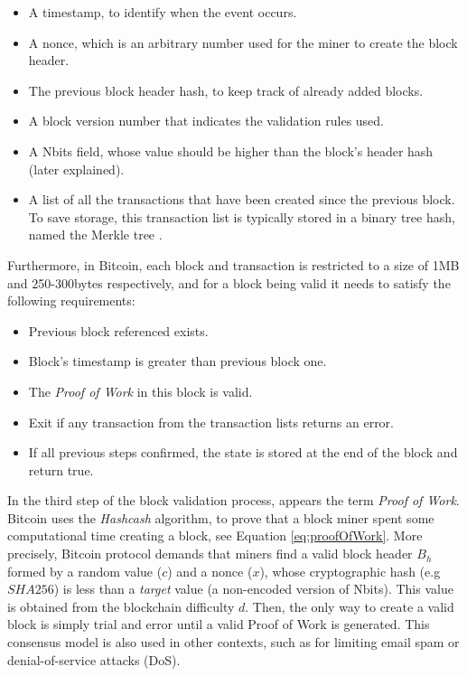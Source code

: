 \begin{itemize}
	\item A timestamp, to identify when the event occurs.
	\item A nonce, which is an arbitrary number used for the miner to create the block header.
	\item The previous block header hash, to keep track of already added blocks.
	\item A block version number that indicates the validation rules used.
	\item A Nbits field, whose value should be higher than the block's header hash (later explained).
	\item A list of all the transactions that have been created since the previous block. To save storage, this transaction list is typically stored in a binary tree hash, named the Merkle tree \citep{merkle1987digital}.

\end{itemize}

Furthermore, in Bitcoin, each block and transaction is restricted to a size of 1MB and 250-300bytes respectively, and for a block being valid it needs to satisfy the following requirements:

\begin{itemize}
	\item Previous block referenced exists.
	\item Block's timestamp is greater than previous block one.
	\item The \textit{Proof of Work} in this block is valid.
	\item Exit if any transaction from the transaction lists returns an error.
	\item If all previous steps confirmed, the state is stored at the end of the block and return true.
\end{itemize}  

In the third step of the block validation process, appears the term \textit{Proof of Work}. Bitcoin uses the \textit{Hashcash} algorithm, to prove that a block miner spent some computational time creating a block, see Equation \ref{eq:proofOfWork}. More precisely, Bitcoin protocol demands that miners find a valid block header $B_h$ formed by a random value ($c$) and a nonce ($x$), whose cryptographic hash (e.g $SHA256$) is less than a \textit{target} value (a non-encoded version of Nbits). This value is obtained from the blockchain difficulty $d$. Then, the only way to create a valid block is simply trial and error until a valid Proof of Work is generated. This consensus model is also used in other contexts, such as for limiting email spam or denial-of-service attacks (DoS).

